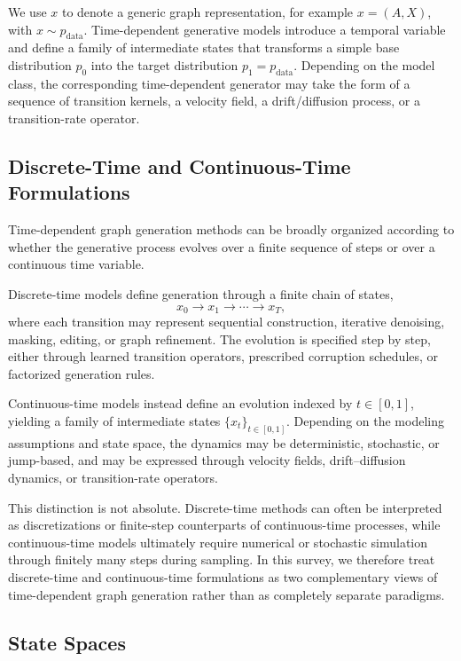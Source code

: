 \documentclass{article}
\begin{document}
We use $x$ to denote a generic graph representation, for example $x=(A,X)$, with $x\sim p_{\mathrm{data}}$. Time-dependent generative models introduce a temporal variable and define a family of intermediate states that transforms a simple base distribution $p_0$ into the target distribution $p_1=p_{\mathrm{data}}$. Depending on the model class, the corresponding time-dependent generator may take the form of a sequence of transition kernels, a velocity field, a drift/diffusion process, or a transition-rate operator.

\subsection{Discrete-Time and Continuous-Time Formulations}
\label{sec:dt_vs_ct}

Time-dependent graph generation methods can be broadly organized according to whether the generative process evolves over a finite sequence of steps or over a continuous time variable.

Discrete-time models define generation through a finite chain of states,
\begin{equation}
x_0 \to x_1 \to \cdots \to x_T,
\end{equation}
where each transition may represent sequential construction, iterative denoising, masking, editing, or graph refinement. The evolution is specified step by step, either through learned transition operators, prescribed corruption schedules, or factorized generation rules.

Continuous-time models instead define an evolution indexed by $t \in [0,1]$, yielding a family of intermediate states $\{x_t\}_{t\in[0,1]}$. Depending on the modeling assumptions and state space, the dynamics may be deterministic, stochastic, or jump-based, and may be expressed through velocity fields, drift--diffusion dynamics, or transition-rate operators.

This distinction is not absolute. Discrete-time methods can often be interpreted as discretizations or finite-step counterparts of continuous-time processes, while continuous-time models ultimately require numerical or stochastic simulation through finitely many steps during sampling. In this survey, we therefore treat discrete-time and continuous-time formulations as two complementary views of time-dependent graph generation rather than as completely separate paradigms.

\subsection{State Spaces}
\label{sec:state_spaces}
\end{document}

